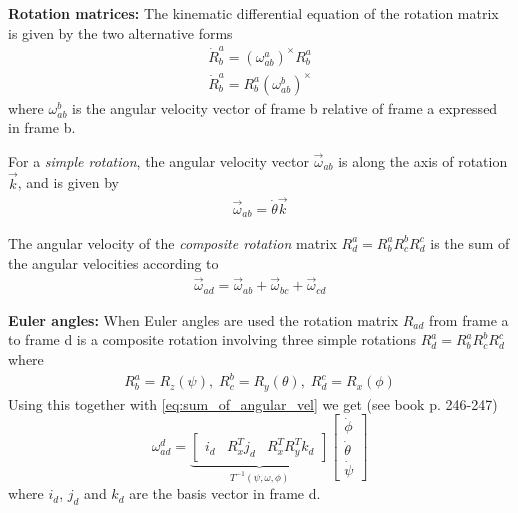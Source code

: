 \textbf{Rotation matrices:}
The kinematic differential equation of the rotation matrix is given by the two alternative forms
\begin{equation*}
    \begin{aligned}
    \dot{R}^a_b = (\omega^a_{ab})^\times R^a_b \\
    \dot{R}^a_b = R^a_b(\omega^b_{ab})^\times
    \end{aligned}
\end{equation*}
where $\omega^b_{ab}$ is the angular velocity vector of frame b relative of frame a expressed in frame b.

For a \emph{simple rotation}, the angular velocity vector $\vec{\omega}_{ab}$ is along the axis of rotation $\vec{k}$, and is given by
\begin{equation*}
    \begin{aligned}
    \vec{\omega}_{ab} = \dot{\theta} \vec{k}
    \end{aligned}
\end{equation*}

The angular velocity of the \emph{composite rotation} matrix $R^a_d = R^a_b R^b_c R^c_d$ is the sum of the angular velocities according to
\begin{equation}
    \begin{aligned}
    \vec{\omega}_{ad} = \vec{\omega}_{ab} + \vec{\omega}_{bc} + \vec{\omega}_{cd}
    \end{aligned}
    \label{eq:sum_of_angular_vel}  
\end{equation}

\textbf{Euler angles:}
When Euler angles are used the rotation matrix $R_{ad}$ from frame a to frame d is a composite rotation involving three simple rotations $R^a_d = R^a_b R^b_c R^c_d$ where
\begin{equation*}
    \begin{aligned}
    R^a_b = R_z(\psi),\; R^b_c = R_y(\theta),\; R^c_d = R_x(\phi)
    \end{aligned}
\end{equation*}
Using this together with \ref{eq:sum_of_angular_vel} we get (see book p. 246-247) 
$$
\omega^d_{ad} =  
\underbrace{
\begin{bmatrix}
    i_d & R^T_x j_d & R^T_x R^T_y k_d
\end{bmatrix}
}_{T^{-1}(\psi, \omega, \phi)}
\begin{bmatrix}
    \dot{\phi} \\ \dot{\theta} \\ \dot{\psi}
\end{bmatrix}
$$
where $i_d$, $j_d$ and $k_d$ are the basis vector in frame d. 


